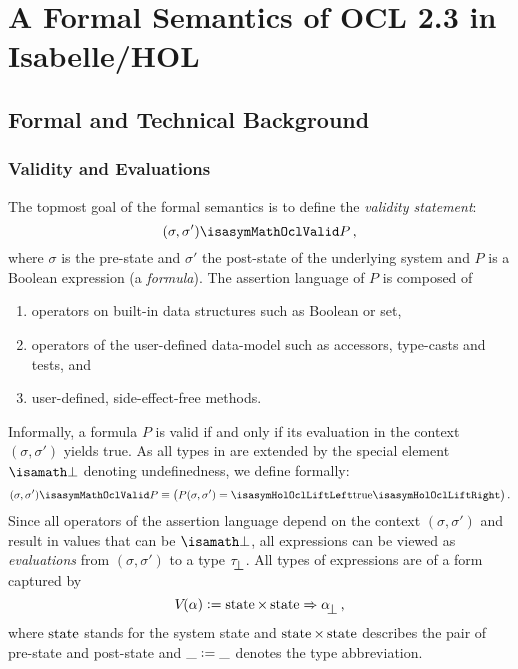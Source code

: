 \part{A Formal Semantics of OCL 2.3 in Isabelle/HOL}
\chapter{Formal and Technical Background}
\section{Validity and Evaluations}
The topmost goal of the formal semantics is to define the
\emph{validity statement}:
\begin{equation*}
   (\sigma, \sigma') \isasymMathOclValid P\mi{,}
\end{equation*}
where $\sigma$ is the pre-state and $\sigma'$ the post-state of the
underlying system and $P$ is a Boolean expression (a
\emph{formula}). The assertion language of $P$ is composed of
\begin{enumerate}
\item operators on built-in data structures such as Boolean or set,
\item operators of the user-defined data-model such as accessors,
  type-casts and tests, and
\item user-defined, side-effect-free methods.
\end{enumerate}
Informally, a formula $P$ is valid if and only if its evaluation in
the context $(\sigma, \sigma')$ yields true. As all types in \holocl
are extended by the special element $\isasymbottom$ denoting
undefinedness, we define formally:
\begin{equation*}
(\sigma, \sigma') \isasymMathOclValid P \equiv \bigl(P(\sigma, \sigma') =
\lift{\HolTrue}\bigr)\mi{.}
\end{equation*}
Since all operators of the assertion language depend on the context $(\sigma,
\sigma')$ and result in values that can be $\isasymbottom$, all expressions can
be viewed as \emph{evaluations} from $(\sigma, \sigma')$ to a type $\up{\tau}$.
All types of expressions are of a form captured by
 \begin{equation*}
 \V{}{\alpha} \defeq \state{} \times \state{} \to \up{\alpha}  \mi{,}
 \end{equation*}
where $\state{}$ stands for the system state and $\state{} \times
\state{}$ describes the pair of pre-state and post-state and
$\_\mathrel{\mathop:}=\_$ denotes the type abbreviation.

